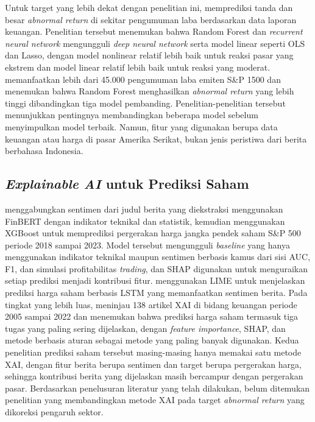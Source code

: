 Untuk target yang lebih dekat dengan penelitian ini, \textcite{amelzadeh2020} memprediksi tanda dan besar \emph{abnormal return} di sekitar pengumuman laba berdasarkan data laporan keuangan. Penelitian tersebut menemukan bahwa Random Forest dan \emph{recurrent neural network} mengungguli \emph{deep neural network} serta model linear seperti OLS dan Lasso, dengan model nonlinear relatif lebih baik untuk reaksi pasar yang ekstrem dan model linear relatif lebih baik untuk reaksi yang moderat. \textcite{schnaubelt2020} memanfaatkan lebih dari 45.000 pengumuman laba emiten S\&P 1500 dan menemukan bahwa Random Forest menghasilkan \emph{abnormal return} yang lebih tinggi dibandingkan tiga model pembanding. Penelitian-penelitian tersebut menunjukkan pentingnya membandingkan beberapa model sebelum menyimpulkan model terbaik. Namun, fitur yang digunakan berupa data keuangan atau harga di pasar Amerika Serikat, bukan jenis peristiwa dari berita berbahasa Indonesia.

\subsection{\emph{Explainable AI} untuk Prediksi Saham}

\textcite{ruan2025} menggabungkan sentimen dari judul berita yang diekstraksi menggunakan FinBERT dengan indikator teknikal dan statistik, kemudian menggunakan XGBoost untuk memprediksi pergerakan harga jangka pendek saham S\&P 500 periode 2018 sampai 2023. Model tersebut mengungguli \emph{baseline} yang hanya menggunakan indikator teknikal maupun sentimen berbasis kamus dari sisi AUC, F1, dan simulasi profitabilitas \emph{trading}, dan SHAP digunakan untuk menguraikan setiap prediksi menjadi kontribusi fitur. \textcite{gite2021} menggunakan LIME untuk menjelaskan prediksi harga saham berbasis LSTM yang memanfaatkan sentimen berita. Pada tingkat yang lebih luas, \textcite{cerneviciene2024} meninjau 138 artikel XAI di bidang keuangan periode 2005 sampai 2022 dan menemukan bahwa prediksi harga saham termasuk tiga tugas yang paling sering dijelaskan, dengan \emph{feature importance}, SHAP, dan metode berbasis aturan sebagai metode yang paling banyak digunakan. Kedua penelitian prediksi saham tersebut masing-masing hanya memakai satu metode XAI, dengan fitur berita berupa sentimen dan target berupa pergerakan harga, sehingga kontribusi berita yang dijelaskan masih bercampur dengan pergerakan pasar. Berdasarkan penelusuran literatur yang telah dilakukan, belum ditemukan penelitian yang membandingkan metode XAI pada target \emph{abnormal return} yang dikoreksi pengaruh sektor.

